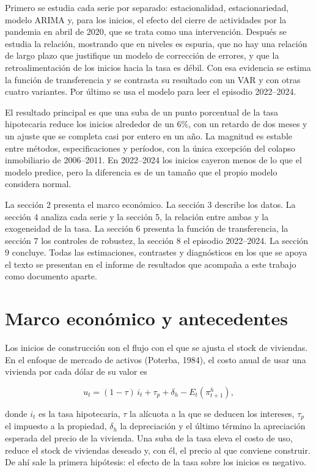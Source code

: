 \documentclass[11pt,a4paper]{article}
\begin{document}
Primero se estudia cada serie por separado: estacionalidad, estacionariedad, modelo ARIMA y, para los inicios, el efecto del cierre de actividades por la pandemia en abril de 2020, que se trata como una intervención. Después se estudia la relación, mostrando que en niveles es espuria, que no hay una relación de largo plazo que justifique un modelo de corrección de errores, y que la retroalimentación de los inicios hacia la tasa es débil. Con esa evidencia se estima la función de transferencia y se contrasta su resultado con un VAR y con otras cuatro variantes. Por último se usa el modelo para leer el episodio 2022--2024.

El resultado principal es que una suba de un punto porcentual de la tasa hipotecaria reduce los inicios alrededor de un 6\%, con un retardo de dos meses y un ajuste que se completa casi por entero en un año. La magnitud es estable entre métodos, especificaciones y períodos, con la única excepción del colapso inmobiliario de 2006--2011. En 2022--2024 los inicios cayeron menos de lo que el modelo predice, pero la diferencia es de un tamaño que el propio modelo considera normal.

La sección 2 presenta el marco económico. La sección 3 describe los datos. La sección 4 analiza cada serie y la sección 5, la relación entre ambas y la exogeneidad de la tasa. La sección 6 presenta la función de transferencia, la sección 7 los controles de robustez, la sección 8 el episodio 2022--2024. La sección 9 concluye. Todas las estimaciones, contrastes y diagnósticos en los que se apoya el texto se presentan en el informe de resultados que acompaña a este trabajo como documento aparte.

\section{Marco económico y antecedentes}

Los inicios de construcción son el flujo con el que se ajusta el stock de viviendas. En el enfoque de mercado de activos (Poterba, 1984), el costo anual de usar una vivienda por cada dólar de su valor es

\[ u_t=(1-\tau)\,i_t+\tau_p+\delta_h-E_t\left(\pi^h_{t+1}\right), \]

donde $i_t$ es la tasa hipotecaria, $\tau$ la alícuota a la que se deducen los intereses, $\tau_p$ el impuesto a la propiedad, $\delta_h$ la depreciación y el último término la apreciación esperada del precio de la vivienda. Una suba de la tasa eleva el costo de uso, reduce el stock de viviendas deseado y, con él, el precio al que conviene construir. De ahí sale la primera hipótesis: el efecto de la tasa sobre los inicios es negativo.
\end{document}
